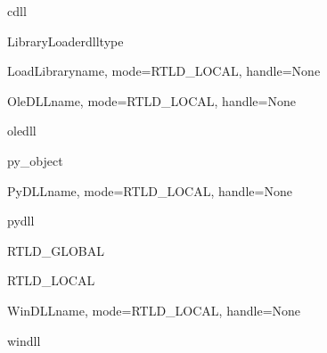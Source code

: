 \begin{datadesc}{cdll}
\end{datadesc}

\begin{classdesc}{LibraryLoader}{dlltype}

\begin{memberdesc}{LoadLibrary}{name, mode=RTLD_LOCAL, handle=None}
\end{memberdesc}

\end{classdesc}

\begin{classdesc}{OleDLL}{name, mode=RTLD_LOCAL, handle=None}
\end{classdesc}

\begin{datadesc}{oledll}
\end{datadesc}

\begin{classdesc}{py_object}{}
\end{classdesc}

\begin{classdesc}{PyDLL}{name, mode=RTLD_LOCAL, handle=None}
\end{classdesc}

\begin{datadesc}{pydll}{}
\end{datadesc}

\begin{datadesc}{RTLD_GLOBAL}
\end{datadesc}

\begin{datadesc}{RTLD_LOCAL}
\end{datadesc}

\begin{classdesc}{WinDLL}{name, mode=RTLD_LOCAL, handle=None}
\end{classdesc}

\begin{datadesc}{windll}
\end{datadesc}

